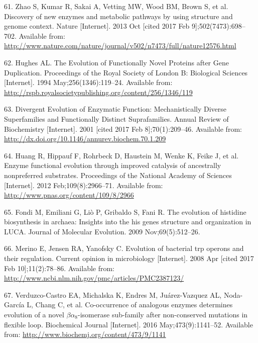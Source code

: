 \documentclass[12pt,twoside]{reedthesis}
\begin{document}
{  \hypertarget{ref-zhao_discovery_2013}{}
  61. Zhao S, Kumar R, Sakai A, Vetting MW, Wood BM, Brown S, et al.
  Discovery of new enzymes and metabolic pathways by using structure and
  genome context. Nature {[}Internet{]}. 2013 Oct {[}cited 2017 Feb
  9{]};502(7473):698--702. Available from:
  \url{http://www.nature.com/nature/journal/v502/n7473/full/nature12576.html}
  
  \hypertarget{ref-hughes_evolution_1994}{}
  62. Hughes AL. The Evolution of Functionally Novel Proteins after Gene
  Duplication. Proceedings of the Royal Society of London B: Biological
  Sciences {[}Internet{]}. 1994 May;256(1346):119--24. Available from:
  \url{http://rspb.royalsocietypublishing.org/content/256/1346/119}
  
  \hypertarget{ref-gerlt_divergent_2001}{}
  63. Divergent Evolution of Enzymatic Function: Mechanistically Diverse
  Superfamilies and Functionally Distinct Suprafamilies. Annual Review of
  Biochemistry {[}Internet{]}. 2001 {[}cited 2017 Feb 8{]};70(1):209--46.
  Available from: \url{http://dx.doi.org/10.1146/annurev.biochem.70.1.209}
  
  \hypertarget{ref-huang_enzyme_2012}{}
  64. Huang R, Hippauf F, Rohrbeck D, Haustein M, Wenke K, Feike J, et al.
  Enzyme functional evolution through improved catalysis of ancestrally
  nonpreferred substrates. Proceedings of the National Academy of Sciences
  {[}Internet{]}. 2012 Feb;109(8):2966--71. Available from:
  \url{http://www.pnas.org/content/109/8/2966}
  
  \hypertarget{ref-fondi_evolution_2009}{}
  65. Fondi M, Emiliani G, Liò P, Gribaldo S, Fani R. The evolution of
  histidine biosynthesis in archaea: Insights into the his genes structure
  and organization in LUCA. Journal of Molecular Evolution. 2009
  Nov;69(5):512--26.
  
  \hypertarget{ref-merino_evolution_2008}{}
  66. Merino E, Jensen RA, Yanofsky C. Evolution of bacterial trp operons
  and their regulation. Current opinion in microbiology {[}Internet{]}.
  2008 Apr {[}cited 2017 Feb 10{]};11(2):78--86. Available from:
  \url{http://www.ncbi.nlm.nih.gov/pmc/articles/PMC2387123/}
  
  \hypertarget{ref-verduzco-castro_co-occurrence_2016}{}
  67. Verduzco-Castro EA, Michalska K, Endres M, Juárez-Vazquez AL,
  Noda-García L, Chang C, et al. Co-occurrence of analogous enzymes
  determines evolution of a novel \(\beta\alpha_8\)-isomerase sub-family
  after non-conserved mutations in flexible loop. Biochemical Journal
  {[}Internet{]}. 2016 May;473(9):1141--52. Available from:
  \url{http://www.biochemj.org/content/473/9/1141}
  
}
\end{document}
